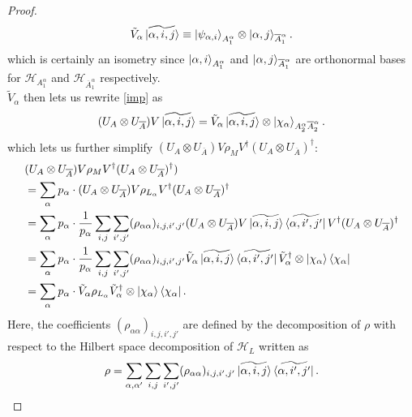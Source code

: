 \documentclass[12pt,a4paper]{report}
\numberwithin{equation}{section}
\newcommand{\ketbra}[2]{\ket{#1}\bra{#2}}
\newcommand{\ketbras}[1]{\ketbra{#1}{#1}}
\newcommand{\ol}[1]{\overline{#1}}
\theoremstyle{definition}
\theoremstyle{theorem}
\theoremstyle{theorem}
\theoremstyle{example}
\theoremstyle{definition}
\begin{document}
\begin{proof}
	\begin{equation}
		\tilde{V}_{\alpha}\ket{\widetilde{\alpha,i,j}}\equiv\ket{\psi_{\alpha,i}}_{A_{1}^{\alpha}}\otimes\ket{\alpha,j}_{\ol{A}_{1}^{\alpha}}.
	\end{equation}
	which is certainly an isometry since $\ket{\alpha,i}_{A_{1}^{\alpha}}$ and $\ket{\alpha,j}_{\ol{A}_{1}^{\alpha}}$ are orthonormal bases for $\mathcal{H}_{A_{1}^{\alpha}}$ and $\mathcal{H}_{\ol{A}_{1}^{\alpha}}$ respectively.\\
	$\tilde{V}_{\alpha}$ then lets us rewrite \ref{imp} as
	\begin{equation}
		(U_{A}\otimes U_{\ol{A}})V\ket{\widetilde{\alpha,i,j}}=\tilde{V}_{\alpha}\ket{\widetilde{\alpha,i,j}}\otimes\ket{\chi_{\alpha}}_{A_{2}^{\alpha}\ol{A}_{2}^{\alpha}}.
	\end{equation}
	which lets us further simplify $(U_{A}\otimes U_{\ol{A}})V\rho_{M} V^{\dagger}(U_{A}\otimes U_{\ol{A}})^{\dagger}$:
	\begin{equation}
		\begin{aligned}
			&(U_{A}\otimes U_{\ol{A}})V\rho_{M} V^{\dagger}(U_{A}\otimes U_{\ol{A}})^{\dagger})\\&=\sum_{\alpha}p_{\alpha}\cdot (U_{A}\otimes U_{\ol{A}})V\rho_{L_{\alpha}} V^{\dagger}(U_{A}\otimes U_{\ol{A}})^{\dagger}\\&=\sum_{\alpha}p_{\alpha}\cdot \frac{1}{p_{\alpha}}\sum_{i,j}\sum_{i',j'}(\rho_{\alpha\alpha})_{i,j,i',j'}(U_{A}\otimes U_{\ol{A}})V\ketbra{\widetilde{\alpha,i,j}}{\widetilde{\alpha,i',j'}} V^{\dagger}(U_{A}\otimes U_{\ol{A}})^{\dagger}\\&=\sum_{\alpha}p_{\alpha}\cdot\frac{1}{p_{\alpha}}\sum_{i,j}\sum_{i',j'}(\rho_{\alpha\alpha})_{i,j,i',j'}\tilde{V}_{\alpha}\ketbra{\widetilde{\alpha,i,j}}{\widetilde{\alpha,i',j'}}\tilde{V}_{\alpha}^{\dagger}\otimes\ketbras{\chi_{\alpha}}\\&=\sum_{\alpha}p_{\alpha}\cdot\tilde{V}_{\alpha}\rho_{L_{\alpha}}\tilde{V}_{\alpha}^{\dagger}\otimes\ketbras{\chi_{\alpha}}.
		\end{aligned}
	\end{equation}
	Here, the coefficients $(\rho_{\alpha\alpha})_{i,j,i',j'}$ are defined by the decomposition of $\rho$ with respect to the Hilbert space decomposition of $\mathcal{H}_{L}$ written as
	\begin{equation}
		\rho=\sum_{\alpha,\alpha'}\sum_{i,j}\sum_{i',j'}(\rho_{\alpha\alpha})_{i,j,i',j'}\ketbra{\widetilde{\alpha,i,j}}{\widetilde{\alpha,i',j'}}.
	\end{equation}

\end{proof}
\end{document}
